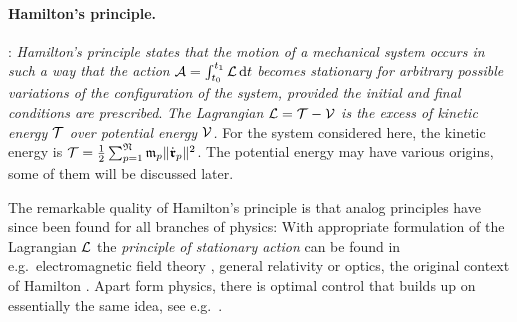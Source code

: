 \paragraph{Hamilton's principle.}
\cite[sec.\ V.1]{Lanczos:Variational}: \textit{Hamilton's principle states that the motion of a mechanical system occurs in such a way that the action} $\mathcal{A} = \int_{t_0}^{t_1} \mathcal{L}\, \mathrm{d} t$ \textit{becomes stationary for arbitrary possible variations of the configuration of the system, provided the initial and final conditions are prescribed}.
\textit{The Lagrangian $\mathcal{L}=\mathcal{T}-\mathcal{V}$ is the excess of kinetic energy $\mathcal{T}$ over potential energy $\mathcal{V}$.}
For the system considered here, the kinetic energy is $\mathcal{T} = \tfrac{1}{2} \sum\nolimits_{p=1}^{\mathfrak{N}} \mathfrak{m}_{p} \| \dot{\boldsymbol{\mathfrak{r}}}_{p} \|_{}^2$.
The potential energy may have various origins, some of them will be discussed later.


The remarkable quality of Hamilton's principle is that analog principles have since been found for all branches of physics:
With appropriate formulation of the Lagrangian $\mathcal{L}$ the \textit{principle of stationary action} can be found in e.g.\ electromagnetic field theory \cite[ch.\ 4]{Landau:Fields}, general relativity \cite{Einstein:HamiltonsPrinciple} or optics, the original context of Hamilton \cite[p.\,192]{Klein:EntwicklungDerMathematik}.
Apart form physics, there is optimal control that builds up on essentially the same idea, see e.g.\ \cite{Bryson:AppliedOptimalControl}.


